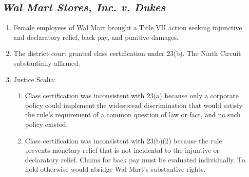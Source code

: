 \subsection{\emph{Wal Mart Stores, Inc. v. Dukes}}

\begin{enumerate}
    \item Female employees of Wal Mart brought a Title VII action seeking 
    injunctive and declaratory relief, back pay, and punitive damages.
    \item The district court granted class certification under 23(b). The 
    Ninth Circuit substantially affirmed.
    \item Justice Scalia:
    \begin{enumerate}
        \item Class certification was inconsistent with 23(a) because only a 
        corporate policy could implement the widespread discrimination that 
        would satisfy the rule's requirement of a common question of law or 
        fact, and no such policy existed.
        \item Class certification was inconsistent with 23(b)(2) because the 
        rule prevents monetary relief that is not incidental to the injuntive 
        or declaratory relief. Claims for back pay must be evaluated 
        individually. To hold otherwise would abridge Wal Mart's substantive 
        rights.
    \end{enumerate}
\end{enumerate}
